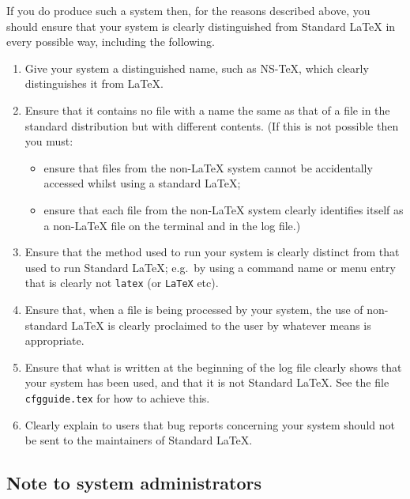 \documentclass{ltxguide}[1995/11/28]
\newcommand{\nstex}{\textsf{NS-TeX}}
\begin{document}
If you do produce such a system then, for the reasons described
above, you should ensure that your system is clearly distinguished
from Standard \LaTeX{} in every possible way, including the following.


\begin{enumerate}
\item
  Give your system a distinguished name, such as \nstex, which clearly
  distinguishes it from \LaTeX{}.

\item
  Ensure that it contains no file with a name the same as that of
  a file in the standard distribution but with different contents.
  (If this is not possible then you must: 
  \begin{itemize}
  \item
    ensure that files from the non-\LaTeX{} system cannot be
    accidentally accessed whilst using a standard \LaTeX{};
  \item ensure that each file from the non-\LaTeX{} system clearly
    identifies itself as a non-\LaTeX{} file on the terminal and in the
    log file.)
  \end{itemize}

\item
  Ensure that the method used to run your system is clearly
\label{mcon:command}
  distinct from that used to run Standard \LaTeX; e.g.~by using a
  command name or menu entry that is clearly not \texttt{latex}
  (or \texttt{LaTeX} etc).

\item
  Ensure that, when a file is being processed by your system, the
  use of non-standard \LaTeX{} is clearly proclaimed to the user by
  whatever means is appropriate.

\item Ensure that what is written at the beginning of the log file
  clearly shows that your system has been used, and that it is 
  not Standard \LaTeX{}.
  See the file \texttt{cfgguide.tex} for how to achieve this.

\item
 Clearly explain to users that bug reports concerning your 
 system should not be sent to the maintainers of Standard
 \LaTeX{}. 
\end{enumerate}

\subsection*{Note to system administrators}
\end{document}
